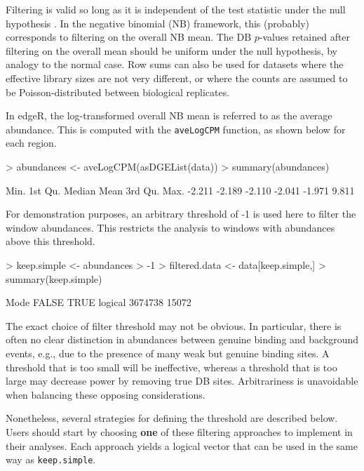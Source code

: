 \documentclass[12pt]{report}
\renewenvironment{Schunk}{\vspace{0pt}}{\vspace{0pt}}
\newcommand{\edger}{edgeR}
\newcommand{\code}[1]{{\small\texttt{#1}}}
\begin{document}
Filtering is valid so long as it is independent of the test statistic under the null hypothesis \citep{bourgon2010}. 
In the negative binomial (NB) framework, this (probably) corresponds to filtering on the overall NB mean. 
The DB $p$-values retained after filtering on the overall mean should be uniform under the null hypothesis, by analogy to the normal case. 
Row sums can also be used for datasets where the effective library sizes are not very different, or where the counts are assumed to be Poisson-distributed between biological replicates. 

In \edger{}, the log-transformed overall NB mean is referred to as the average abundance.
This is computed with the \code{aveLogCPM} function, as shown below for each region.

\begin{Schunk}
\begin{Sinput}
> abundances <- aveLogCPM(asDGEList(data))
> summary(abundances)
\end{Sinput}
\begin{Soutput}
   Min. 1st Qu.  Median    Mean 3rd Qu.    Max. 
 -2.211  -2.189  -2.110  -2.041  -1.971   9.811 
\end{Soutput}
\end{Schunk}

For demonstration purposes, an arbitrary threshold of -1 is used here to filter the window abundances. 
This restricts the analysis to windows with abundances above this threshold.

\begin{Schunk}
\begin{Sinput}
> keep.simple <- abundances > -1
> filtered.data <- data[keep.simple,]
> summary(keep.simple)
\end{Sinput}
\begin{Soutput}
   Mode   FALSE    TRUE 
logical 3674738   15072 
\end{Soutput}
\end{Schunk}

The exact choice of filter threshold may not be obvious.
In particular, there is often no clear distinction in abundances between genuine binding and background events, e.g., due to the presence of many weak but genuine binding sites.
A threshold that is too small will be ineffective, whereas a threshold that is too large may decrease power by removing true DB sites.
Arbitrariness is unavoidable when balancing these opposing considerations.

Nonetheless, several strategies for defining the threshold are described below.
Users should start by choosing \textbf{one} of these filtering approaches to implement in their analyses.
Each approach yields a logical vector that can be used in the same way as \code{keep.simple}.
\end{document}
